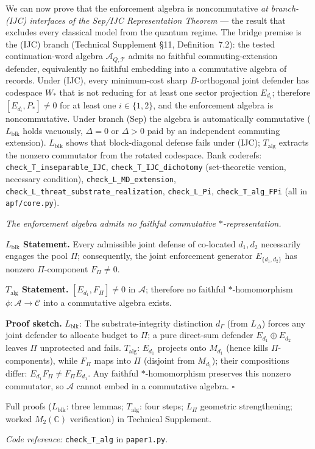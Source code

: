 \documentclass[11pt]{article}
\theoremstyle{remark}
\newcommand{\coderef}[2]{\smallskip\noindent\textit{Code reference:} \texttt{#1} in \texttt{#2}.}
\begin{document}
\smallskip\noindent We can now prove that the enforcement algebra is noncommutative \emph{at branch-(IJC) interfaces of the Sep/IJC Representation Theorem} --- the result that excludes every classical model from the quantum regime. The bridge premise is the (IJC) branch (Technical Supplement \S11, Definition~7.2): the tested continuation-word algebra $\mathcal{A}_{Q,\mathcal{T}}$ admits no faithful commuting-extension defender, equivalently no faithful embedding into a commutative algebra of records. Under (IJC), every minimum-cost sharp $B$-orthogonal joint defender has codespace $W_*$ that is not reducing for at least one sector projection $E_{d_i}$; therefore $[E_{d_i}, P_*] \ne 0$ for at least one $i \in \{1, 2\}$, and the enforcement algebra is noncommutative. Under branch (Sep) the algebra is automatically commutative ($L_{\mathrm{blk}}$ holds vacuously, $\Delta = 0$ or $\Delta > 0$ paid by an independent commuting extension). $L_{\mathrm{blk}}$ shows that block-diagonal defense fails under (IJC); $T_{\mathrm{alg}}$ extracts the nonzero commutator from the rotated codespace. Bank coderefs: \texttt{check\_T\_inseparable\_IJC}, \texttt{check\_T\_IJC\_dichotomy} (set-theoretic version, necessary condition), \texttt{check\_L\_MD\_extension}, \texttt{check\_L\_threat\_substrate\_realization}, \texttt{check\_L\_Pi}, \texttt{check\_T\_alg\_FPi} (all in \texttt{apf/core.py}).

\begin{tcolorbox}[apfbox, title={$L_{\mathrm{blk}}$ (Block Failure) and $T_{\mathrm{alg}}$ (Noncommutativity)}]
\label{cor:T_alg}
\textit{The enforcement algebra admits no faithful commutative $*$-representation.}

\smallskip\noindent\textbf{$L_{\mathrm{blk}}$ Statement.}  Every admissible joint defense of co-located $d_1, d_2$ necessarily engages the pool $\Pi$; consequently, the joint enforcement generator $E_{\{d_1,d_2\}}$ has nonzero $\Pi$-component $F_\Pi \ne 0$.

\smallskip\noindent\textbf{$T_{\mathrm{alg}}$ Statement.}  $[E_{d_1}, F_\Pi] \ne 0$ in $\mathcal{A}$; therefore no faithful $*$-homomorphism $\phi: \mathcal{A} \to \mathcal{C}$ into a commutative algebra exists.

\smallskip\noindent\textbf{Proof sketch.}  $L_{\mathrm{blk}}$: The substrate-integrity distinction $d_\Gamma$ (from $L_\Delta$) forces any joint defender to allocate budget to $\Pi$; a pure direct-sum defender $E_{d_1} \oplus E_{d_2}$ leaves $\Pi$ unprotected and fails.  $T_{\mathrm{alg}}$: $E_{d_1}$ projects onto $M_{d_1}$ (hence kills $\Pi$-components), while $F_\Pi$ maps into $\Pi$ (disjoint from $M_{d_1}$); their compositions differ: $E_{d_1} F_\Pi \ne F_\Pi E_{d_1}$.  Any faithful $*$-homomorphism preserves this nonzero commutator, so $\mathcal{A}$ cannot embed in a commutative algebra.  \hfill$\square$

\smallskip\noindent Full proofs ($L_{\mathrm{blk}}$: three lemmas; $T_{\mathrm{alg}}$: four steps; $L_\Pi$ geometric strengthening; worked $M_2(\mathbb{C})$ verification) in Technical Supplement.

\coderef{check\_T\_alg}{paper1.py}
\end{tcolorbox}
\end{document}
